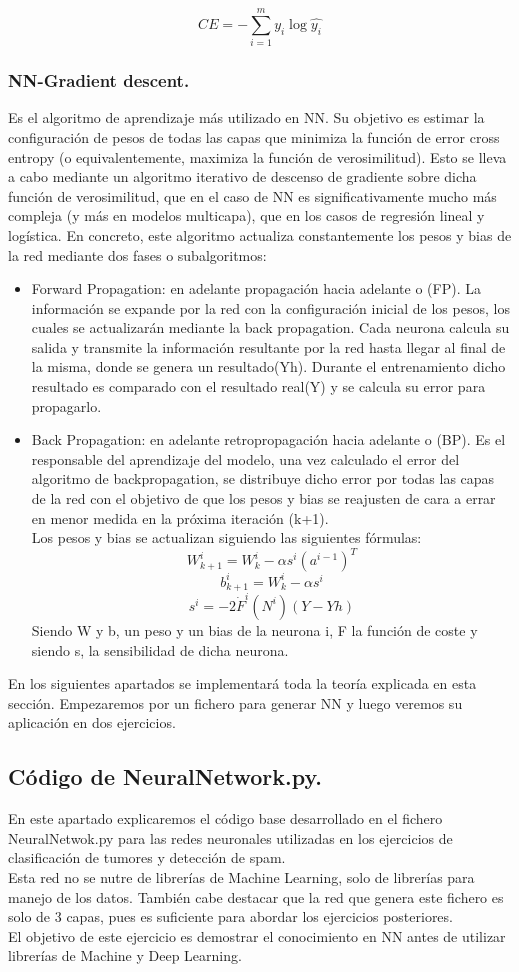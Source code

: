 \documentclass[a4paper,10pt]{article}
\begin{document}
\[
CE=-\sum_{i=1}^m y_i \log\hat{y_i}
\]
\subsubsection{NN-Gradient descent.}
Es el algoritmo de aprendizaje más utilizado en NN. Su objetivo es estimar
la configuración de pesos de todas las capas que minimiza la función de error
cross entropy (o equivalentemente, maximiza la función de verosimilitud). Esto
se lleva a cabo mediante un algoritmo iterativo de descenso de gradiente sobre
dicha función de verosimilitud, que en el caso de NN es significativamente mucho
más compleja (y más en modelos multicapa), que en los casos de regresión lineal
y logística. En concreto, este algoritmo actualiza constantemente los pesos y bias
de la red mediante dos fases o subalgoritmos:

\begin{itemize}
    \item Forward Propagation: en adelante propagación hacia adelante o (FP). La información se expande por la red con la configuración inicial de los pesos, los cuales se actualizarán mediante la back propagation. Cada neurona calcula su salida y transmite la información resultante por la red hasta llegar al final de la misma, donde se genera un resultado(Yh). Durante el entrenamiento dicho resultado es comparado con el resultado real(Y) y se calcula su error para propagarlo.
    \item Back Propagation: en adelante retropropagación hacia adelante o (BP). Es el responsable del aprendizaje del modelo, una vez calculado el error del algoritmo de backpropagation, se distribuye dicho error por todas las capas de la red con el objetivo de que los pesos y bias se reajusten de cara a errar en menor medida en la próxima iteración (k+1). \\Los pesos y bias se actualizan siguiendo las siguientes fórmulas:
    \[
    W_{k+1}^i  = W_{k}^i  - \alpha s^i (a^{i-1})^T
    \]
    \[
    b_{k+1}^i = W_{k}^i  - \alpha s^i
    \]
    \[
    s^i = -2\dot{F}^i(N^i)(Y-Yh)
    \]
    Siendo W y b, un peso y un bias de la neurona i, F la función de coste y siendo s, la sensibilidad de dicha neurona.
\end{itemize}
\noindent
En los siguientes apartados se implementará toda la teoría explicada en esta sección. Empezaremos por un fichero para generar NN y luego veremos su aplicación en dos ejercicios.
\subsection{Código de NeuralNetwork.py.}
En este apartado explicaremos el código base desarrollado en el fichero NeuralNetwok.py para las redes neuronales utilizadas en los ejercicios de clasificación de tumores y detección de spam.\\ Esta red no se nutre de librerías de Machine Learning, solo de librerías para manejo de los datos. También cabe destacar que la red que genera este fichero es solo de 3 capas, pues es suficiente para abordar los ejercicios posteriores.\\ El objetivo de este ejercicio es demostrar el conocimiento en NN antes de utilizar librerías de Machine y Deep Learning.
\end{document}
